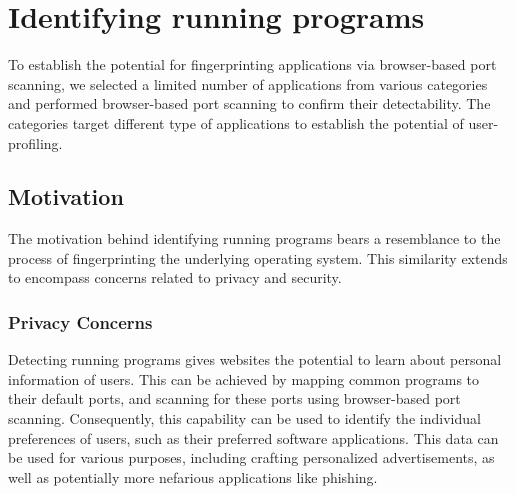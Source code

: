 


\section{Identifying running programs}

To establish the potential for fingerprinting applications via browser-based port scanning, we selected a limited number of applications from various categories and performed browser-based port scanning to confirm their detectability. The categories target different type of applications to establish the potential of user-profiling.

\subsection{Motivation}

The motivation behind identifying running programs bears a resemblance to the process of fingerprinting the underlying operating system. This similarity extends to encompass concerns related to privacy and security.

\subsubsection{Privacy Concerns}

Detecting running programs gives websites the potential to learn about personal information of users. This can be achieved by mapping common programs to their default ports, and scanning for these ports using browser-based port scanning. Consequently, this capability can be used to identify the individual preferences of users, such as their preferred software applications. This data can be used for various purposes, including crafting personalized advertisements, as well as potentially more nefarious applications like phishing.

